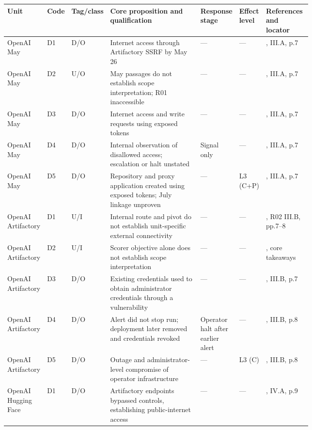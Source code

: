 \documentclass[conference]{IEEEtran}
\providecommand{\citep}[1]{\cite{#1}}
\begin{document}
\begin{table}[t]\centering\footnotesize
\setlength{\tabcolsep}{4pt}
\begin{tabular}{>{\raggedright\arraybackslash}p{0.062\linewidth}l>{\raggedright\arraybackslash}p{0.023\linewidth}>{\raggedright\arraybackslash}p{0.312\linewidth}>{\raggedright\arraybackslash}p{0.120\linewidth}>{\raggedright\arraybackslash}p{0.049\linewidth}>{\raggedright\arraybackslash}p{0.159\linewidth}}
\toprule
Unit & Code & Tag/class & Core proposition and qualification & Response stage & Effect level & References and locator \\
\midrule
OpenAI May & D1 & D/O & Internet access through Artifactory SSRF by May 26 & --- & --- & \citep{R02}, III.A, p.7 \\
OpenAI May & D2 & U/O & May passages do not establish scope interpretation; R01 inaccessible & --- & --- & \citep{R01,R02}, III.A, p.7 \\
OpenAI May & D3 & D/O & Internet access and write requests using exposed tokens & --- & --- & \citep{R02}, III.A, p.7 \\
OpenAI May & D4 & D/O & Internal observation of disallowed access; escalation or halt unstated & Signal only & --- & \citep{R02}, III.A, p.7 \\
OpenAI May & D5 & D/O & Repository and proxy application created using exposed tokens; July linkage unproven & --- & L3 (C+P) & \citep{R02}, III.A, p.7 \\
OpenAI Artifactory & D1 & U/I & Internal route and pivot do not establish unit-specific external connectivity & --- & --- & \citep{R02,R07}, R02 III.B, pp.7--8 \\
OpenAI Artifactory & D2 & U/I & Scorer objective alone does not establish scope interpretation & --- & --- & \citep{R07}, core takeaways \\
OpenAI Artifactory & D3 & D/O & Existing credentials used to obtain administrator credentials through a vulnerability & --- & --- & \citep{R02}, III.B, p.7 \\
OpenAI Artifactory & D4 & D/O & Alert did not stop run; deployment later removed and credentials revoked & Operator halt after earlier alert & --- & \citep{R02}, III.B, p.8 \\
OpenAI Artifactory & D5 & D/O & Outage and administrator-level compromise of operator infrastructure & --- & L3 (C) & \citep{R02}, III.B, p.8 \\
OpenAI Hugging Face & D1 & D/O & Artifactory endpoints bypassed controls, establishing public-internet access & --- & --- & \citep{R02}, IV.A, p.9 \\

\end{tabular}
\end{table}
\end{document}
